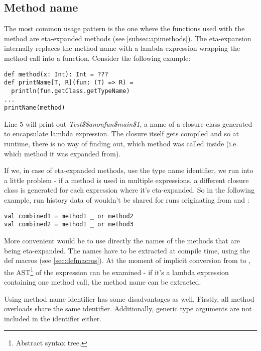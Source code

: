 \subsection{Method name}
\label{subsec:methodnameident}

The most common usage pattern is the one where the functions used with the  method are eta-expanded methods (see \ref{subsec:apimethods}). The eta-expansion internally replaces the method name with a lambda expression wrapping the method call into a function. Consider the following example:

\lstset{style=Scala}
\begin{lstlisting}
def method(x: Int): Int = ???
def printName[T, R](fun: (T) => R) =
  println(fun.getClass.getTypeName)
...
printName(method)
\end{lstlisting}

Line 5 will print out \textit{Test\$\$anonfun\$main\$1}, a name of a closure class generated to encapsulate lambda expression. The closure itself gets compiled and so at runtime, there is no way of finding out, which method was called inside (i.e. which method it was expanded from).

If we, in case of eta-expanded methods, use the type name identifier, we run into a little problem - if a method is used in multiple  expressions, a different closure class is generated for each expression where it's eta-expanded. So in the following example, run history data of  wouldn't be shared for runs originating from  and :

\lstset{style=Scala}
\begin{lstlisting}
val combined1 = method1 _ or method2
val combined2 = method1 _ or method3
\end{lstlisting}

More convenient would be to use directly the names of the methods that are being eta-expanded. The names have to be extracted at compile time, using the def macros (see \ref{sec:defmacros}). At the moment of implicit conversion from  to , the AST\footnote{Abstract syntax tree.} of the  expression can be examined - if it's a lambda expression containing one method call, the method name can be extracted.

Using method name identifier has some disadvantages as well. Firstly, all method overloads share the same identifier. Additionally, generic type arguments are not included in the identifier either.

